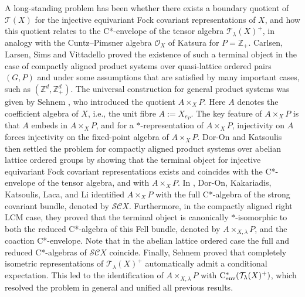 \documentclass[11pt,final]{amsart}
\numberwithin{equation}{section}
\theoremstyle{plain}
\theoremstyle{definition}
\theoremstyle{remark}
\newcommand{\C}{{\mathcal{C}}}
\renewcommand{\O}{{\mathcal{O}}}
\renewcommand{\S}{{\mathcal{S}}}
\newcommand{\T}{{\mathcal{T}}}
\def\la{\lambda}
\newcommand{\bZ}{\mathbb{Z}}
\newcommand{\cenv}{\mathrm{C}^*_{\textup{env}}}
\begin{document}
A long-standing problem has been whether there exists a boundary quotient of $\T(X)$ for the injective equivariant Fock covariant representations of $X$, and how this quotient relates to the C*-envelope of the tensor algebra $\T_\la(X)^+$, in analogy with the Cuntz--Pimsner algebra $\O_X$ of Katsura \cite{Kat04} for $P=\bZ_+$. Carlsen, Larsen, Sims and Vittadello \cite{CLSV11} proved the existence of such a terminal object in the case of compactly aligned product systems over quasi-lattice ordered pairs $(G,P)$ and under some assumptions that are satisfied by many important cases, such as $(\bZ^d,\bZ_+^d)$. The universal construction for general product systems was given by Sehnem \cite{Seh19}, who introduced the quotient $A\times_X P$. Here $A$ denotes the coefficient algebra of $X$, i.e., the unit fibre $A:= X_{e_P}$. The key feature of $A\times_X P$ is that $A$ embeds in $A\times_X P$, and for a $*$-representation of $A\times_X P$, injectivity on $A$ forces injectivity on the fixed-point algebra of $A\times_X P$. Dor-On and Katsoulis \cite{DK20} then settled the problem for compactly aligned product systems over abelian lattice ordered groups by showing that the terminal object for injective equivariant Fock covariant representations exists and coincides with the C*-envelope of the tensor algebra, and with $A\times_X P$.
In \cite{DKKLL22}, Dor-On, Kakariadis, Katsoulis, Laca, and Li identified $A\times_X P$ with the full C*-algebra of the strong covariant bundle, denoted by $\S\C X$. Furthermore, in the compactly aligned right LCM case, they proved that the terminal object is canonically $*$-isomorphic to both the reduced C*-algebra of this Fell bundle, denoted by $A\times_{X,\la}P$, and the coaction C*-envelope. Note that in the abelian lattice ordered case the full and reduced C*-algebras of $\S\C X$ coincide. Finally, Sehnem \cite{Seh22} proved that completely isometric representations of $\T_\la(X)^+$ automatically admit a conditional expectation. This led to the identification of $A\times_{X,\la}P$ with $\cenv(\T_\la(X)^+)$, which resolved the problem in general and unified all previous results.
\end{document}
